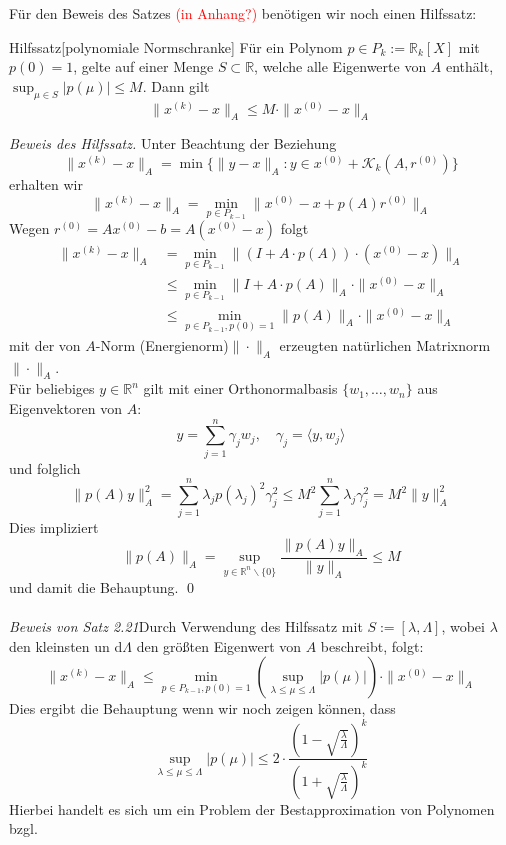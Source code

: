\documentclass{article}
\begin{document}
    Für den Beweis des Satzes \textcolor{red}{(in Anhang?)} benötigen wir noch einen Hilfssatz:
    \begin{thmbox}{Hilfssatz}[polynomiale Normschranke]
        Für ein Polynom $p\in P_k:=\mathbb{R}_k[X]$ mit $p(0)=1$, gelte auf einer Menge $S\subset \mathbb{R}$, welche
        alle Eigenwerte von $A$ enthält, $\sup_{\mu\in S} |p(\mu)| \leq M$. Dann gilt 
        \[\|x^{(k)} - x\|_A \leq M\cdot\|x^{(0)}-x\|_A\]
    \end{thmbox}
    \textit{Beweis des Hilfssatz.} Unter Beachtung der Beziehung 
    \[\|x^{(k)}-x\|_A = \min\{\|y-x\|_A : y\in x^{(0)}+\mathcal{K}_k(A,r^{(0)})\}\]
    erhalten wir 
    \[\|x^{(k)}-x\|_A = \min_{p\in P_{k-1}}\|x^{(0)}-x+p(A)r^{(0)}\|_A\]
    Wegen $r^{(0)} = Ax^{(0)}-b = A(x^{(0)}-x)$ folgt
    \begin{align*}
        \|x^{(k)}-x\|_A &= \min_{p\in P_{k-1}} \|(I+A\cdot p(A))\cdot (x^{(0)}-x)\|_A \\
        &\leq \min_{p\in P_{k-1}} \|I+A\cdot p(A)\|_A\cdot\|x^{(0)}-x\|_A \\
        &\leq \min_{p\in P_{k-1}, p(0)=1} \|p(A)\|_A\cdot\|x^{(0)}-x\|_A 
    \end{align*}
    mit der von $A$-Norm (Energienorm)$\|\cdot\|_A$ erzeugten natürlichen Matrixnorm $\|\cdot\|_A$. \\
    Für beliebiges $y\in\mathbb{R}^n$ gilt mit einer Orthonormalbasis $\{w_1,\dotsc,w_n\}$ aus Eigenvektoren von $A$:
    \[y=\sum_{j=1}^{n}\gamma_j w_j,\quad \gamma_j = \langle y, w_j\rangle\]
    und folglich 
    \[\|p(A)y\|_A^2 = \sum_{j=1}^{n} \lambda_j p(\lambda_j)^2\gamma_j^2 
    \leq M^2 \sum_{j=1}^{n} \lambda_j \gamma_j^2 = M^2 \|y\|_A^2\]
    Dies impliziert 
    \[\|p(A)\|_A = \sup_{y\in\mathbb{R}^n\backslash\{0\}} \dfrac{\|p(A)y\|_A}{\|y\|_A}\leq M\]
    und damit die Behauptung. \qed \\ \\
    \textit{Beweis von Satz 2.21}Durch Verwendung des Hilfssatz mit $S:=[\lambda, \Lambda]$, 
    wobei $\lambda$ den kleinsten un d$\Lambda$ den größten Eigenwert von $A$ beschreibt, folgt:
    \[\|x^{(k)}-x\|_A \leq \min_{p\in P_{k-1}, p(0)=1} 
    \left(\sup_{\lambda\leq\mu\leq\Lambda}|p(\mu)|\right)\cdot\|x^{(0)}-x\|_A \]
    Dies ergibt die Behauptung wenn wir noch zeigen können, dass 
    \[\sup_{\lambda\leq\mu\leq\Lambda}|p(\mu)| 
    \leq 2\cdot \dfrac{(1-\sqrt{\tfrac{\lambda}{\Lambda}})^k}{(1+\sqrt{\tfrac{\lambda}{\Lambda}})^k}\]
    Hierbei handelt es sich um ein Problem der Bestapproximation von Polynomen bzgl. 
\end{document}
